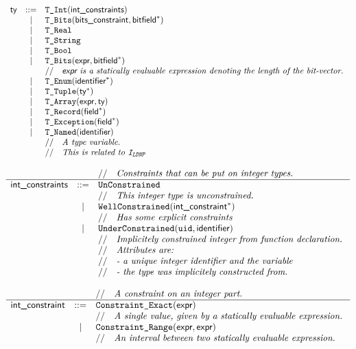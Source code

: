 \documentclass{book}
\begin{document}
\[
\begin{array}{rcl}
\ty &::=& \TInt(\intconstraints) \\
  &|& \TBits(\bitsconstraint, \bitfield^{*}) \\
  &|& \TReal \\
  &|& \TString \\
  &|& \TBool \\
  &|& \TBits(\expr, \bitfield^{*}) \\
  & & \ASTComment{\expr\ is a statically evaluable expression denoting the length of the bit-vector.}\\
  &|& \TEnum(\identifier^{*}) \\
  &|& \TTuple(\ty^{*}) \\
  &|& \TArray(\expr, \ty) \\
  &|& \TRecord(\Field^{*}) \\
  &|& \TException(\Field^{*}) \\
  &|& \TNamed(\identifier)\\
  & & \ASTComment{A type variable.}\\
  & & \ASTComment{This is related to \identi{LDNP}}
\end{array}
\]

\[
  \begin{array}{rcl}
    & & //\quad\textit{Constraints that can be put on integer types.}\   \\
    \hline
    \textsf{int\_constraints} & ::=
      & \texttt{UnConstrained}                                      \\
    & & //\quad\textit{This integer type is unconstrained.}\             \\
    &|& \texttt{WellConstrained}(\textsf{int\_constraint}^{*})                \\
    & & //\quad\textit{Has some explicit constraints}\                   \\
    &|& \texttt{UnderConstrained}(\texttt{uid}, \textsf{identifier})        \\
    & & //\quad\textit{Implicitely constrained integer from function declaration.}\  \\
    & & //\quad\textit{Attributes are:}\  \\
    & & //\quad\textit{- a unique integer identifier and the variable}\  \\
    & & //\quad\textit{- the type was implicitely constructed from.}\  \\
  \end{array}
\]

\[
\begin{array}{rcl}
& & //\quad\textit{A constraint on an integer part.}\ \\
\hline
\textsf{int\_constraint} &::=& \texttt{Constraint\_Exact}(\textsf{expr}) \\
  & & //\quad\textit{A single value, given by a statically evaluable expression.}\ \\
  &|& \texttt{Constraint\_Range}(\textsf{expr}, \textsf{expr}) \\
  & & //\quad\textit{An interval between two statically evaluable expression.}\ \\
\end{array}
\]
\end{document}
